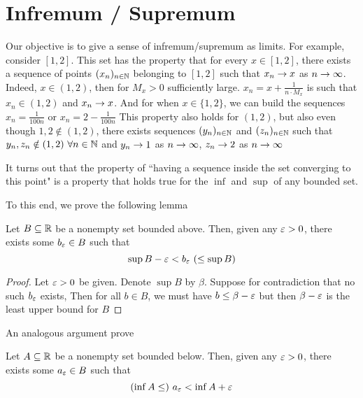 \section{Infremum / Supremum}
Our objective is to give a sense of infremum/supremum as limits.
For example, consider $\left[1, 2\right]$. 
This set has the property that for every $x \in \left[1, 2\right]$, there exists a sequence of points $(x_n)_{n\in\mathbb N}$ belonging to $\left[1, 2\right]$ such that $x_n \rightarrow x$ as $n \rightarrow \infty$.
Indeed, $x\in(1, 2)$, then for $M_x > 0$ sufficiently large. $x_n = x + \frac{1}{n\cdot M_x}$ is such that $x_n \in (1, 2)$ and $x_n \rightarrow x$.
And for when $x \in \{1, 2\}$, we can build the sequences $x_n = \frac{1}{100n}$ or $x_n = 2- \frac{1}{100n}$
This property also holds for $(1, 2)$, but also even though $1, 2 \notin (1, 2)$, 
there exists sequences $(y_n)_{n\in\mathbb N}$ and $(z_n)_{n\in\mathbb N}$ such that $y_n, z_n \notin (1, 2)\ \forall n \in \mathbb N$ and $y_n \rightarrow 1$ as $n \rightarrow \infty$, $z_n \rightarrow 2$ as $n \rightarrow \infty$

It turns out that the property of ``having a sequence inside the set converging to this point" is a property that holds true for the $\inf$ and $\sup$ of any bounded set.

To this end, we prove the following lemma

\begin{lemma}\label{lem:bab}
    Let $B \subseteq \mathbb R$ be a nonempty set bounded above.
    Then, given any $\varepsilon > 0$, there exists some $b_\varepsilon \in B$ such that $$\sup B - \varepsilon < b_\varepsilon\ (\leq \sup B)$$
\end{lemma}
\begin{proof}
    Let $\varepsilon > 0$ be given. 
    Denote $\sup B$ by $\beta$.
    Suppose for contradiction that no such $b_\varepsilon$ exists, Then for all $b \in B$, 
    we must have $b \leq \beta - \varepsilon$ but then $\beta - \varepsilon$ is the least upper bound for $B$
\end{proof}

An analogous argument prove
\begin{lemma}\label{lem:bbl}
    Let $A \subseteq \mathbb R$ be a nonempty set bounded below.
    Then, given any $\varepsilon > 0$, there exists some $a_\varepsilon \in B$ such that $$(\inf A \leq)\ a_\varepsilon < \inf A + \varepsilon$$
\end{lemma}


